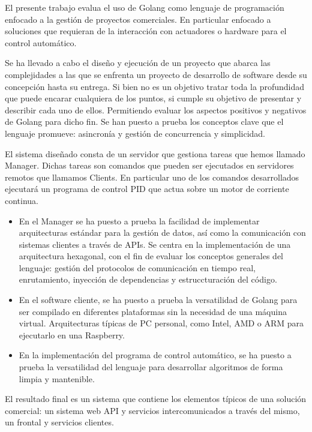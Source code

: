 
El presente trabajo evalua el uso de Golang como lenguaje de programación enfocado a la gestión de proyectos comerciales. En particular enfocado a soluciones que requieran de la interacción con actuadores o hardware para el control automático.

Se ha llevado a cabo el diseño y ejecución de un proyecto que abarca las complejidades a las que se enfrenta un proyecto de desarrollo de software desde su concepción hasta su entrega. Si bien no es un objetivo tratar toda la profundidad que puede encarar cualquiera de los puntos, si cumple su objetivo de presentar y describir cada uno de ellos. Permitiendo evaluar los aspectos positivos y negativos de Golang para dicho fin. Se han puesto a prueba los conceptos clave que el lenguaje promueve: asincronía y gestión de concurrencia y simplicidad.

El sistema diseñado consta de un servidor que gestiona tareas que hemos llamado Manager. Dichas tareas son comandos que pueden ser ejecutados en servidores remotos que llamamos Clients. En particular uno de los comandos desarrollados ejecutará un programa de control PID que actua sobre un motor de corriente continua.

\begin{itemize}
    \item En el Manager se ha puesto a prueba la facilidad de implementar arquitecturas estándar para la gestión de datos, así como la comunicación con sistemas clientes a través de APIs. Se centra en la implementación de una arquitectura hexagonal, con el fin de evaluar los conceptos generales del lenguaje: gestión del protocolos de comunicación en tiempo real, enrutamiento, inyección de dependencias y estruccturación del código.
    \item En el software cliente, se ha puesto a prueba la versatilidad de Golang para ser compilado en diferentes plataformas sin la necesidad de una máquina virtual. Arquitecturas típicas de PC personal, como Intel, AMD o ARM para ejecutarlo en una Raspberry.
    \item  En la implementación del programa de control automático, se ha puesto a prueba la versatilidad del lenguaje para desarrollar algoritmos de forma limpia y mantenible.
\end{itemize}

El resultado final es un sistema que contiene los elementos típicos de una solución comercial: un sistema web API y servicios intercomunicados a través del mismo, un frontal y servicios clientes.
